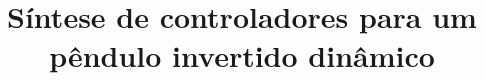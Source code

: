 \documentclass{tcc}
\title{Síntese de controladores para um pêndulo invertido dinâmico}
\begin{document}
    \maketitle{}
    
    \toc{}
    
    
    
    
    
    
\end{document}
